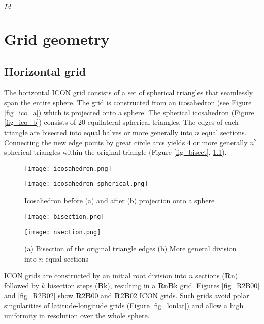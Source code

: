 \svnInfo $Id$
\chapter{Grid geometry}

\section{Horizontal grid}
The horizontal ICON grid consists of a set of spherical triangles that seamlessly span the entire sphere. The grid is constructed from an icosahedron (see Figure 
\ref{fig_ico_a}) which is projected onto a sphere. The spherical icosahedron (Figure \ref{fig_ico_b}) consists of $20$ equilateral spherical triangles. The edges of each triangle 
are bisected into equal halves or more generally into $n$ equal sections. Connecting the new edge points by great circle arcs yields $4$ or more generally $n^2$ spherical triangles 
within the original triangle (Figure \ref{fig_bisect}, \ref{fig_nsect}). 

\begin{figure}[h]
  \begin{minipage}[b]{0.4\textwidth}
    \centering
    \texttt{[image: icosahedron.png]}
    \subcaption{}\label{fig_ico_a}
  \end{minipage}\hfill
  \begin{minipage}[b]{0.4\textwidth}
    \centering
    \texttt{[image: icosahedron\_spherical.png]}
    \subcaption{}\label{fig_ico_b}
  \end{minipage}\hfill
  \caption{Icosahedron before (a) and after (b) projection onto a sphere }

\hfill

  \begin{minipage}[b]{0.4\textwidth}
    \centering
    \texttt{[image: bisection.png]}
    \subcaption{}\label{fig_bisect}
  \end{minipage}\hfill
  \begin{minipage}[b]{0.4\textwidth}
    \centering
    \texttt{[image: nsection.png]}
    \subcaption{}\label{fig_nsect}
  \end{minipage}\hfill
  \caption{(a) Bisection of the original triangle edges (b) More general division into $n$ equal sections}
\end{figure}

ICON grids are constructed by an initial root division into $n$ sections (\textbf{R}n) followed by $k$ bisection steps (\textbf{B}k), 
resulting in a \textbf{R}n\textbf{B}k grid. Figures \ref{fig_R2B00} and \ref{fig_R2B02} show \textbf{R}2\textbf{B}00 and 
\textbf{R}2\textbf{B}02 ICON grids. Such grids avoid polar singularities of latitude-longitude grids (Figure \ref{fig_lonlat}) 
and allow a high uniformity in resolution over the whole sphere.

